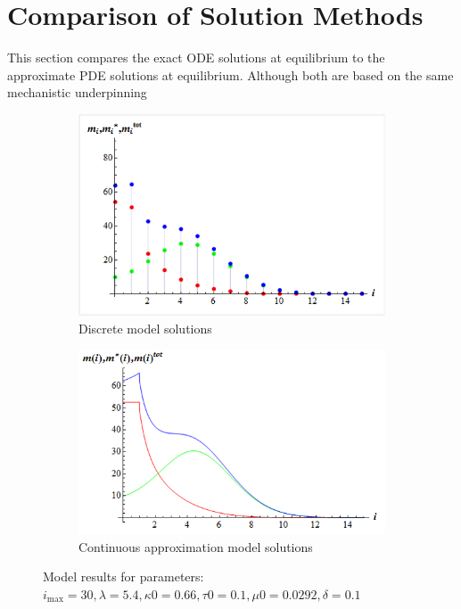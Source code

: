 \documentclass[review]{elsarticle}
\newcommand{\imax}{\ensuremath{i_{\max}}\xspace}
\begin{document}
\section{Comparison of Solution Methods}
This section compares the exact ODE solutions at equilibrium to the approximate PDE solutions at equilibrium.
Although both are based on the same mechanistic underpinning 

\begin{figure}[ht]
\centering
\begin{subfigure}[ht]{0.4\textwidth}
\includegraphics[width=\textwidth]{Images/ex_disc_eq}
\caption{Discrete model solutions}
\end{subfigure}
\begin{subfigure}[ht]{0.4\textwidth}
\includegraphics[width=\textwidth]{Images/ex_cont_eq}
\caption{Continuous approximation model solutions}
\end{subfigure}
\caption{Model results for parameters: $\imax=30,\lambda=5.4,\kappa 0=0.66,\tau 0=0.1,\mu 0=0.0292,\delta=0.1$}
\end{figure}
\end{document}
